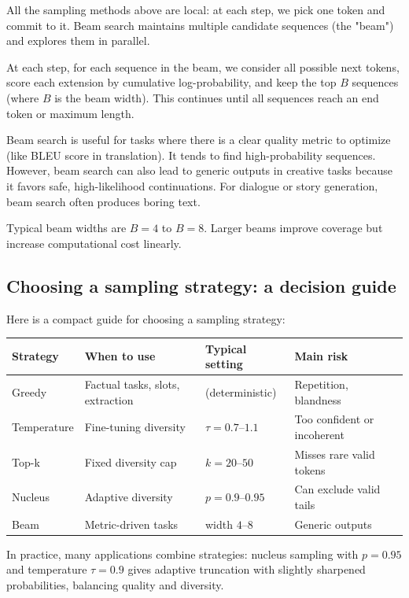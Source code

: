 All the sampling methods above are local: at each step, we pick one token and commit to it. Beam search maintains multiple candidate sequences (the "beam") and explores them in parallel.

At each step, for each sequence in the beam, we consider all possible next tokens, score each extension by cumulative log-probability, and keep the top $B$ sequences (where $B$ is the beam width). This continues until all sequences reach an end token or maximum length.

Beam search is useful for tasks where there is a clear quality metric to optimize (like BLEU score in translation). It tends to find high-probability sequences. However, beam search can also lead to generic outputs in creative tasks because it favors safe, high-likelihood continuations. For dialogue or story generation, beam search often produces boring text.

Typical beam widths are $B=4$ to $B=8$. Larger beams improve coverage but increase computational cost linearly.

\subsection{Choosing a sampling strategy: a decision guide}
\label{sec:sampling_choice}

Here is a compact guide for choosing a sampling strategy:

\begin{center}
\small
\begin{tabular}{p{} p{} p{} p{}}
\toprule
\textbf{Strategy} & \textbf{When to use} & \textbf{Typical setting} & \textbf{Main risk} \\
\midrule
Greedy & Factual tasks, slots, extraction & (deterministic) & Repetition, blandness \\
Temperature & Fine-tuning diversity & $\tau=0.7$--$1.1$ & Too confident or incoherent \\
Top-k & Fixed diversity cap & $k=20$--$50$ & Misses rare valid tokens \\
Nucleus & Adaptive diversity & $p=0.9$--$0.95$ & Can exclude valid tails \\
Beam & Metric-driven tasks & width $4$--$8$ & Generic outputs \\
\bottomrule
\end{tabular}
\end{center}

In practice, many applications combine strategies: nucleus sampling with $p=0.95$ and temperature $\tau=0.9$ gives adaptive truncation with slightly sharpened probabilities, balancing quality and diversity.

